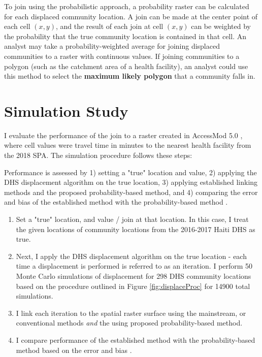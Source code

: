 To join using the probabilistic approach, a probability raster can be calculated for each displaced community location. A join can be made at the center point of each cell $(x,y)$, and the result of each join at cell $(x,y)$ can be weighted by the probability that the true community location is contained in that cell. An analyst may take a \textbf{}{probability-weighted average} for joining displaced communities to a raster with continuous values. If joining communities to a polygon (such as the catchment area of a health facility), an analyst could use this method to select the \textbf{maximum likely polygon} that a community falls in.

\section{Simulation Study}

I evaluate the performance of the join to a raster created in AccessMod 5.0 \autocite{who_accessmod_2021}, where cell values were travel time in minutes to the nearest health facility from the 2018 SPA. The simulation procedure follows these steps:

Performance is assessed by 1) setting a "true" location and value, 2) applying the DHS displacement algorithm on the true location, 3) applying established linking methods and the proposed probability-based method, and 4) comparing the error and bias of the established method with the probability-based method \autocite{morris_using_2019}.

\begin{enumerate}
    \item Set a "true" location, and value / join at that location. In this case, I treat the given locations of community locations from the 2016-2017 Haiti DHS as true.
    \item Next, I apply the DHS displacement algorithm on the true location - each time a displacement is performed is referred to as an iteration. I perform 50 Monte Carlo simulations of displacement for 298 DHS community locations based on the procedure outlined in Figure \ref{fig:displaceProc} for 14900 total simulations.
    \item I link each iteration to the spatial raster surface using the mainstream, or conventional methods \textit{and} the using proposed probability-based method.
    \item I compare performance of the established method with the probability-based method based on the error and bias \autocite{morris_using_2019}.
\end{enumerate}

